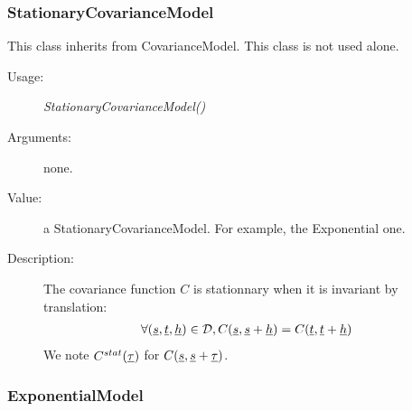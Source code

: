 \subsubsection{StationaryCovarianceModel}

This class inherits from CovarianceModel. This class is not used alone.\\

\begin{description}

\item[Usage:] \textit{StationaryCovarianceModel()}
\bigskip

\item[Arguments:]  none.
\bigskip

\item[Value:] a StationaryCovarianceModel. For example, the Exponential one.
\bigskip

\item[Description:]

The covariance function  $C$ is stationnary when it  is invariant by  translation:
\begin{eqnarray}\label{covStat}
\forall ({\underline{s}},{\underline{t}},{\underline{h}}) \in {\mathcal D},  &  \, C({\underline{s}}, {\underline{s}}+{\underline{h}})  =C({\underline{t}}, {\underline{t}}+{\underline{h}})
\end{eqnarray}
We note $C^{stat}({\underline{\tau}})$ for  $C({\underline{s}}, {\underline{s}}+{\underline{\tau}})$.

\end{description}



\newpage
\subsubsection{ExponentialModel}

\label{expModel}


